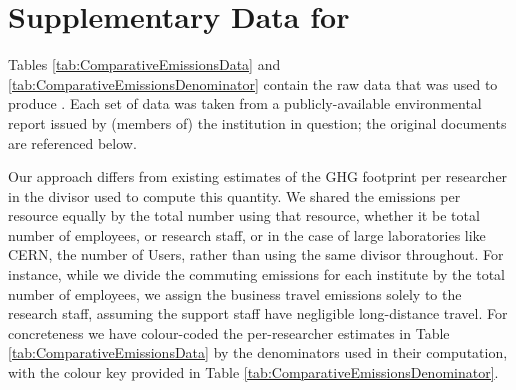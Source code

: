 \documentclass[../SustainableHEP.tex]{subfiles}
\begin{document}
\RaggedRight
\sloppy
\clearpage


\section{Supplementary Data for }
\label{sec:DataforFig1.4}

Tables \ref{tab:ComparativeEmissionsData} and \ref{tab:ComparativeEmissionsDenominator} contain the raw data that was used to produce .  Each set of data was taken from a publicly-available environmental report issued by (members of) the institution in question; the original documents are referenced below.

Our approach differs from existing estimates of the GHG footprint per researcher in the divisor used to compute this quantity.  We shared the emissions per resource equally by the total number using that resource, whether it be total number of employees, or research staff, or in the case of large laboratories like CERN, the number of Users, rather than using the same divisor throughout.  For instance, while we divide the commuting emissions for each institute by the total number of employees, we assign the business travel emissions solely to the research staff, assuming the support staff have negligible long-distance travel.  For concreteness we have colour-coded the per-researcher estimates in Table \ref{tab:ComparativeEmissionsData} by the denominators used in their computation, with the colour key provided in Table \ref{tab:ComparativeEmissionsDenominator}. 
\end{document}
